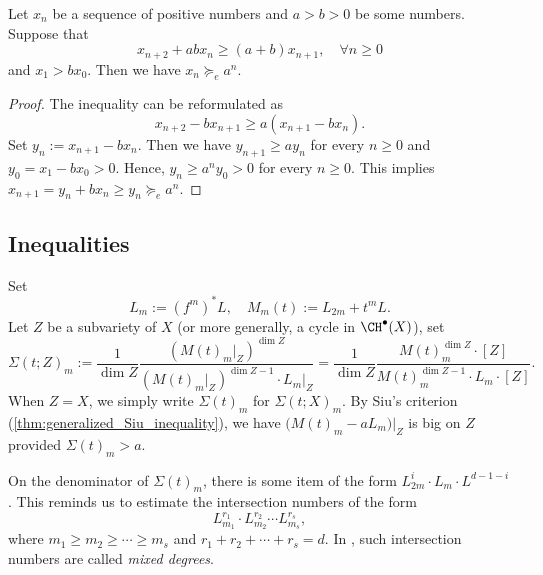 
  
  \begin{lemma}\label{lemma:recursive_inequality_implies_exponential_growth}
    Let $x_n$ be a sequence of positive numbers and $a>b>0$ be some numbers.
    Suppose that 
    \[ x_{n+2} + ab x_n \geq (a+b) x_{n+1}, \quad \forall n \geq 0 \]
    and $x_1 > b x_0$.
    Then we have $x_n \succcurlyeq_e a^n$.
  \end{lemma}
  \begin{proof}
    The inequality can be reformulated as
    \[ x_{n+2} - b x_{n+1} \geq a (x_{n+1} - b x_n). \]
    Set $y_n := x_{n+1} - b x_n$.
    Then we have $y_{n+1} \geq a y_n$ for every $n \geq 0$ and $y_0 = x_1 - b x_0 > 0$.
    Hence, $y_n \geq a^n y_0 > 0$ for every $n \geq 0$.
    This implies $x_{n+1} = y_n + b x_n \geq y_n \succcurlyeq_e a^n$.
  \end{proof}


\subsection{Inequalities}


  Set 
  \[ L_m := (f^m)^* L, \quad M_m(t) := L_{2m} + t^m L. \]
  Let $Z$ be a subvariety of $X$ (or more generally, a cycle in $\CH^\bullet(X)$),  set 
  \[ \Sigma(t;Z)_m := \frac{1}{\dim Z} \frac{\left(M(t)_m|_Z\right)^{\dim Z}}{\left(M(t)_m|_Z\right)^{\dim Z - 1} \cdot L_m|_Z} = \frac{1}{\dim Z} \frac{M(t)_m^{\dim Z} \cdot [Z]}{M(t)_m^{\dim Z - 1} \cdot L_m \cdot [Z]}. \]
  When $Z = X$, we simply write $\Sigma(t)_m$ for $\Sigma(t;X)_m$.
  By Siu's criterion (\cref{thm:generalized_Siu_inequality}), we have $\bigl(M(t)_m - a L_m\bigr)|_Z$ is big on $Z$ provided $\Sigma(t)_m > a$.

  On the denominator of $\Sigma(t)_m$, there is some item of the form $L_{2m}^i \cdot L_m \cdot L^{d-1-i}$.
  This reminds us to estimate the intersection numbers of the form 
  \[ L_{m_1}^{r_1} \cdot L_{m_2}^{r_2} \cdots L_{m_s}^{r_s}, \]
  where $m_1 \geq m_2 \geq \cdots \geq m_s$ and $r_1 + r_2 + \cdots + r_s = d$.
  In \cite{Xie24recursive_inequalities}, such intersection numbers are called \emph{mixed degrees}.

